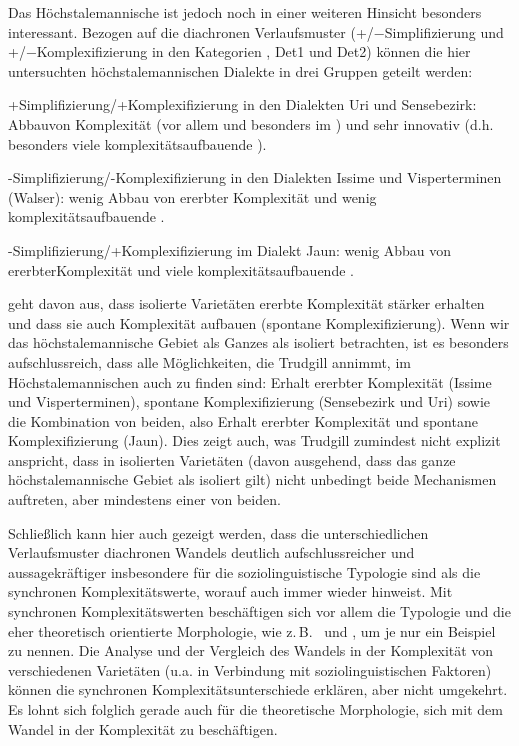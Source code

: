 Das Höchstalemannische ist jedoch noch in einer weiteren Hinsicht besonders interessant. Bezogen auf die diachronen Verlaufsmuster (+/−Sim\-pli\-fi\-zie\-rung und +/−Kom\-ple\-xi\-fi\-zie\-rung in den Kategorien , Det1 und Det2) können die hier untersuchten höchstalemannischen Dialekte in drei Gruppen geteilt werden:

\begin{longdescription}
\item[+Simplifizierung/+Komplexifizierung in den Dialekten Uri und Sensebezirk:] Abbau\linebreak von Komplexität (vor allem  und besonders im ) und sehr innovativ (d.h. besonders viele komplexitätsaufbauende ).
\item[-Simplifizierung/-Komplexifizierung in den Dialekten Issime und Visperterminen (Walser):] wenig Abbau von ererbter Komplexität und wenig komplexitätsaufbauende .
\item[-Simplifizierung/+Komplexifizierung im Dialekt Jaun:] wenig Abbau von ererbter\linebreak Komplexität und viele komplexitätsaufbauende .
\end{longdescription}


\citet{Trudgill2011} geht davon aus, dass isolierte Varietäten ererbte Komplexität stärker erhalten und dass sie auch Komplexität aufbauen (spontane Komplexifizierung). Wenn wir das höchstalemannische Gebiet als Ganzes als isoliert betrachten, ist es besonders aufschlussreich, dass alle Möglichkeiten, die Trudgill annimmt, im Höchstalemannischen auch zu finden sind: Erhalt ererbter Komplexität (Issime und Visperterminen), spontane Komplexifizierung (Sensebezirk und Uri) sowie die Kombination von beiden, also Erhalt ererbter Komplexität und spontane Komplexifizierung (Jaun). Dies zeigt auch, was Trudgill zumindest nicht explizit anspricht, dass in isolierten Varietäten (davon ausgehend, dass das ganze höchstalemannische Gebiet als isoliert gilt) nicht unbedingt beide Mechanismen auftreten, aber mindestens einer von beiden.

Schließlich kann hier auch gezeigt werden, dass die unterschiedlichen Verlaufsmuster diachronen Wandels deutlich aufschlussreicher und aussagekräftiger insbesondere für die soziolinguistische Typologie sind als die synchronen Komplexitätswerte, worauf auch \citet{Trudgill2011} immer wieder hinweist. Mit synchronen Komplexitätswerten beschäftigen sich vor allem die Typologie und die eher theoretisch orientierte Morphologie, wie z.\,B.\ \citet{Sinnemäki2011} und \citet{Camilleri2012}, um je nur ein Beispiel zu nennen. Die Analyse und der Vergleich des Wandels in der Komplexität von verschiedenen Varietäten (u.a. in Verbindung mit soziolinguistischen Faktoren) können die synchronen Komplexitätsunterschiede erklären, aber nicht umgekehrt. Es lohnt sich folglich gerade auch für die theoretische Morphologie, sich mit dem Wandel in der Komplexität zu beschäftigen.